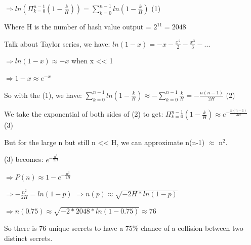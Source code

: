 \documentclass[12pt, a4paper, oneside]{report}
\begin{document}
$\Rightarrow ln(\Pi_{k = 0}^{n-1} (1 - \frac{k}{H})) = \sum_{k = 0}^{n-1} ln(1 - \frac{k}{H})$ (1)

Where H is the number of hash value output = $2^{11} = 2048$

Talk about Taylor series, we have:
$ln (1-x) = -x - \frac{x^2}{2} - \frac{x^3}{3} - ...$

$\Rightarrow ln (1-x) \approx -x$ when x << 1

$\Rightarrow 1-x \approx e^{-x}$

So with the (1), we have:
$\sum_{k = 0}^{n-1} ln(1 - \frac{k}{H}) \approx - \sum_{k = 0}^{n-1} \frac{k}{H} = -\frac{n(n-1)}{2H}$ (2)

We take the exponential of both sides of (2) to get:
$\Pi_{k = 0}^{n-1} (1 - \frac{k}{H}) \approx e^{-\frac{n(n-1)}{2H}}$ (3)

But for the large n but still n << H, we can approximate n(n-1) $\approx$ n$^2$.

(3) becomes:
$e ^{-\frac{n^2}{2H}}$ 

$\Rightarrow P(n) \approx 1 - e^{-\frac{n^2}{2H}}$

$\Rightarrow - \frac{n^2}{2H} = ln(1 - p)$
$\Rightarrow n(p) \approx \sqrt{-2H * ln(1 - p)}$

$\Rightarrow n(0.75) \approx \sqrt{-2 * 2048 * ln(1 - 0.75)} \approx 76$

So there is 76 unique secrets to have a 75\% chance of a collision between two distinct secrets.
\end{document}
